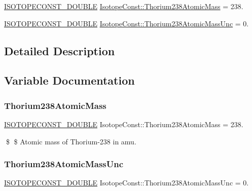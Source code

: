 \begin{DoxyCompactItemize}
\item 
\mbox{\hyperlink{group___isotope_const-_macros_ga8f45a7272ce02c0b4c65c44636ed719a}{I\+S\+O\+T\+O\+P\+E\+C\+O\+N\+S\+T\+\_\+\+D\+O\+U\+B\+LE}} \mbox{\hyperlink{group___isotope_const-_thorium-_th238_ga3ea4ba9426003c58d9d87e6747bcb456}{Isotope\+Const\+::\+Thorium238\+Atomic\+Mass}} = 238.
\item 
\mbox{\hyperlink{group___isotope_const-_macros_ga8f45a7272ce02c0b4c65c44636ed719a}{I\+S\+O\+T\+O\+P\+E\+C\+O\+N\+S\+T\+\_\+\+D\+O\+U\+B\+LE}} \mbox{\hyperlink{group___isotope_const-_thorium-_th238_gae94d8273b5aa17206bf590ea7179353e}{Isotope\+Const\+::\+Thorium238\+Atomic\+Mass\+Unc}} = 0.
\end{DoxyCompactItemize}


\subsection{Detailed Description}


\subsection{Variable Documentation}
\mbox{\label{group___isotope_const-_thorium-_th238_ga3ea4ba9426003c58d9d87e6747bcb456}} 
\subsubsection{\texorpdfstring{Thorium238\+Atomic\+Mass}{Thorium238AtomicMass}}
{\footnotesize\ttfamily \mbox{\hyperlink{group___isotope_const-_macros_ga8f45a7272ce02c0b4c65c44636ed719a}{I\+S\+O\+T\+O\+P\+E\+C\+O\+N\+S\+T\+\_\+\+D\+O\+U\+B\+LE}} Isotope\+Const\+::\+Thorium238\+Atomic\+Mass = 238.}

\$ \$ Atomic mass of Thorium-\/238 in amu. \mbox{\label{group___isotope_const-_thorium-_th238_gae94d8273b5aa17206bf590ea7179353e}} 
\subsubsection{\texorpdfstring{Thorium238\+Atomic\+Mass\+Unc}{Thorium238AtomicMassUnc}}
{\footnotesize\ttfamily \mbox{\hyperlink{group___isotope_const-_macros_ga8f45a7272ce02c0b4c65c44636ed719a}{I\+S\+O\+T\+O\+P\+E\+C\+O\+N\+S\+T\+\_\+\+D\+O\+U\+B\+LE}} Isotope\+Const\+::\+Thorium238\+Atomic\+Mass\+Unc = 0.}

